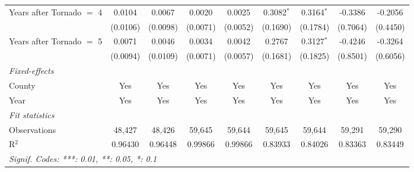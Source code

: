 \documentclass[letterpaper]{article}
\begin{document}
\begin{table}[H]
\begin{tabular}{lcccccccc}
  Years after Tornado $=$ 4  & 0.0104          & 0.0067          & 0.0020          & 0.0025          & 0.3082$^{*}$    & 0.3164$^{*}$    & -0.3386        & -0.2056\\   
                                             & (0.0106)        & (0.0098)        & (0.0071)        & (0.0052)        & (0.1690)        & (0.1784)        & (0.7064)       & (0.4450)\\   
   Years after Tornado $=$ 5  & 0.0071          & 0.0046          & 0.0034          & 0.0042          & 0.2767          & 0.3127$^{*}$    & -0.4246        & -0.3264\\   
                                             & (0.0094)        & (0.0109)        & (0.0071)        & (0.0057)        & (0.1681)        & (0.1825)        & (0.8501)       & (0.6056)\\   
   \midrule
   \emph{Fixed-effects}\\
   County                                    & Yes             & Yes             & Yes             & Yes             & Yes             & Yes             & Yes            & Yes\\  
   Year                                      & Yes             & Yes             & Yes             & Yes             & Yes             & Yes             & Yes            & Yes\\  
   \midrule
   \emph{Fit statistics}\\
   Observations                              & 48,427          & 48,426          & 59,645          & 59,644          & 59,645          & 59,644          & 59,291         & 59,290\\  
   R$^2$                                     & 0.96430         & 0.96448         & 0.99866         & 0.99866         & 0.83933         & 0.84026         & 0.83363        & 0.83449\\  

   \midrule \midrule
   \multicolumn{9}{l}{\emph{Signif. Codes: ***: 0.01, **: 0.05, *: 0.1}}\\
\end{tabular}
\end{table}

\end{document}
